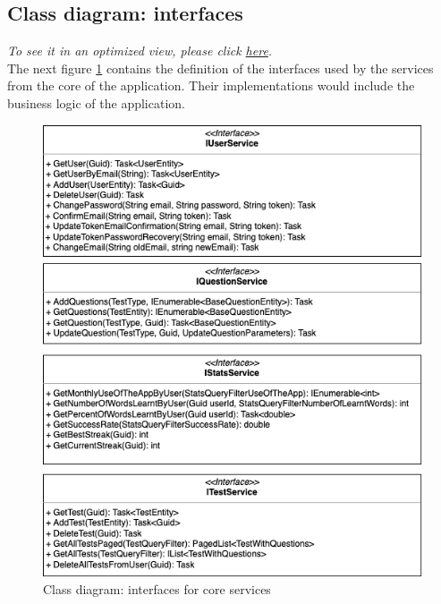         \subsection{Class diagram: interfaces}
            \textit{To see it in an optimized view, please click \href{https://github.com/JesusGonzalezA/LearnASLDoc/blob/master/doc/assets/diagrams/interfaces.png}{here}.} \\
            The next figure \ref{fig:implementation_interfaces} contains the definition of the interfaces used by the services from the core of the application. Their implementations 
            would include the business logic of the application.
            \begin{figure}[H]
                \centering
                    \includegraphics[width=\textwidth]{assets/diagrams/interfaces.png}
                \caption{Class diagram: interfaces for core services}
                \label{fig:implementation_interfaces}
            \end{figure}

